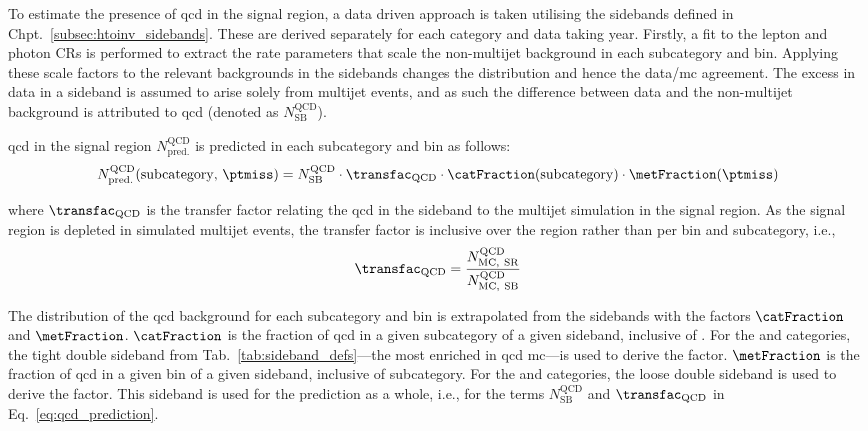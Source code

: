 To estimate the presence of \acrshort{qcd} in the signal region, a data driven approach is taken utilising the sidebands defined in Chpt.~\ref{subsec:htoinv_sidebands}. These are derived separately for each category and data taking year. Firstly, a fit to the lepton and photon \glspl{CR} is performed to extract the rate parameters that scale the non-multijet background in each subcategory and \ptmiss bin. Applying these scale factors to the relevant backgrounds in the sidebands changes the distribution and hence the data/\acrshort{mc} agreement. The excess in data in a sideband is assumed to arise solely from multijet events, and as such the difference between data and the non-multijet background is attributed to \acrshort{qcd} (denoted as $N_{\mathrm{SB}}^{\mathrm{QCD}}$).

\acrshort{qcd} in the signal region $N_{\mathrm{pred.}}^{\mathrm{QCD}}$ is predicted in each subcategory and \ptmiss bin as follows: 
\begin{equation}
    N_{\mathrm{pred.}}^{\mathrm{QCD}}(\mathrm{subcategory}, \, \ptmiss) = N_{\mathrm{SB}}^{\mathrm{QCD}} \cdot \transfac_{\mathrm{QCD}} \cdot \catFraction(\mathrm{subcategory}) \cdot \metFraction(\ptmiss)
    \label{eq:qcd_prediction}
\end{equation}

where $\transfac_{\mathrm{QCD}}$ is the transfer factor relating the \acrshort{qcd} in the sideband to the multijet simulation in the signal region. As the signal region is depleted in simulated multijet events, the transfer factor is inclusive over the region rather than per \ptmiss bin and subcategory, i.e.,
\begin{equation}
    \transfac_{\mathrm{QCD}} = \frac{ N_{\mathrm{MC, \ SR}}^{\mathrm{QCD}} } { N_{\mathrm{MC, \ SB}}^{\mathrm{QCD}} }
    \label{eq:transfer_factor_qcd}
\end{equation}

The distribution of the \acrshort{qcd} background for each subcategory and \ptmiss bin is extrapolated from the sidebands with the factors $\catFraction$ and $\metFraction$. $\catFraction$ is the fraction of \acrshort{qcd} in a given subcategory of a given sideband, inclusive of \ptmiss. For the \ttH and \ggH categories, the tight double sideband from Tab.~\ref{tab:sideband_defs}---the most enriched in \acrshort{qcd} \acrshort{mc}---is used to derive the factor. $\metFraction$ is the fraction of \acrshort{qcd} in a given \ptmiss bin of a given sideband, inclusive of subcategory. For the \ttH and \ggH categories, the loose double sideband is used to derive the factor. This sideband is used for the prediction as a whole, i.e., for the terms $N_{\mathrm{SB}}^{\mathrm{QCD}}$ and $\transfac_{\mathrm{QCD}}$ in Eq.~\ref{eq:qcd_prediction}.

